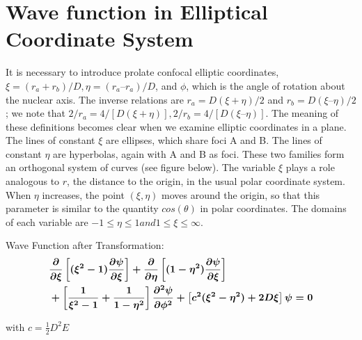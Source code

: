 \documentclass[12pt]{report}
\begin{document}
	\section{Wave function in Elliptical Coordinate System}
		\boldmath \normalsize{It is necessary to introduce prolate confocal elliptic coordinates, $ \xi = (r_{a} + r_{b} )/D, \eta = (r_{a} – r_{a} )/D$, and $\phi$, which is the angle of rotation about the nuclear axis. The inverse relations are $r_{a} = D(\xi+ \eta)/2$ and $r_{b} = D(\xi – \eta)/2$; we note that $2/r_{a} = 4/[D(\xi + \eta)], 2/r_{b} = 4/[D(\xi – \eta)]$. The meaning of these definitions becomes clear when we examine elliptic coordinates in a plane. The lines of constant $\xi$ are ellipses, which share foci A and B. The lines of constant $\eta$ are hyperbolas, again with A and B as foci. These two families form an orthogonal system of curves (see figure below). The variable $\xi$ plays a role analogous to $r$, the distance to the origin, in the usual polar coordinate system. When $\eta$ increases, the point $(\xi,\eta)$ moves around the origin, so that this parameter is similar to the quantity $cos(\theta)$ in polar coordinates. The domains of each variable are $-1 ≤ \eta ≤ 1 and 1 ≤ \xi ≤ ∞$.}\\
		\vspace{0.1cm}
		
		\raggedright
		
		{\normalsize{Wave Function after Transformation:}}
		\begin{equation}
			\boldmath \normalsize
			\begin{aligned}
				 & \frac{\partial}{\partial \xi}\left[({\xi}^{2}-1)\frac{\partial \psi}{\partial \xi}\right] + \frac{\partial}{\partial \eta}\left[(1-{\eta}^{2})\frac{\partial \psi}{\partial \xi}\right] \\ 
					& +\left[\frac{1}{{\xi}^{2}-1}+\frac{1}{1-{\eta}^{2}}\right]\frac{{\partial}^{2}\psi}{\partial{\phi}^{2}} +
					 \left[{c}^{2}({\xi}^{2}-{\eta}^{2})+2D{\xi}\right]\psi = 0
			\end{aligned}
		\end{equation}
		
		\normalsize{with \boldmath $c=\frac{1}{2}D^{2}E$ } 
		
\end{document}
